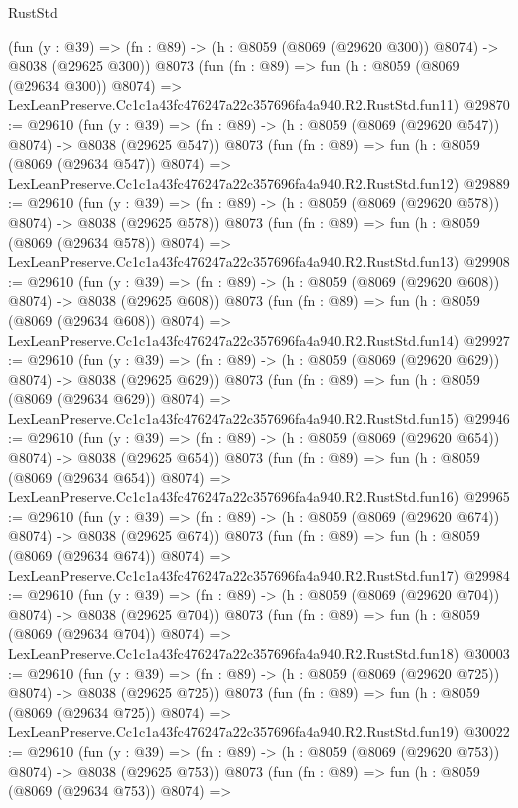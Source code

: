\begin{lexlean}{RustStd}
\begin{coremodule}
    (fun (y : @39) => (fn : @89) -> (h : @8059 (@8069 (@29620 @300)) @8074) -> @8038 (@29625 @300))
    @8073
    (fun (fn : @89) =>
    fun (h : @8059 (@8069 (@29634 @300)) @8074) =>
    LexLeanPreserve.Cc1c1a43fc476247a22c357696fa4a940.R2.RustStd.fun11)
@29870 := @29610
    (fun (y : @39) => (fn : @89) -> (h : @8059 (@8069 (@29620 @547)) @8074) -> @8038 (@29625 @547))
    @8073
    (fun (fn : @89) =>
    fun (h : @8059 (@8069 (@29634 @547)) @8074) =>
    LexLeanPreserve.Cc1c1a43fc476247a22c357696fa4a940.R2.RustStd.fun12)
@29889 := @29610
    (fun (y : @39) => (fn : @89) -> (h : @8059 (@8069 (@29620 @578)) @8074) -> @8038 (@29625 @578))
    @8073
    (fun (fn : @89) =>
    fun (h : @8059 (@8069 (@29634 @578)) @8074) =>
    LexLeanPreserve.Cc1c1a43fc476247a22c357696fa4a940.R2.RustStd.fun13)
@29908 := @29610
    (fun (y : @39) => (fn : @89) -> (h : @8059 (@8069 (@29620 @608)) @8074) -> @8038 (@29625 @608))
    @8073
    (fun (fn : @89) =>
    fun (h : @8059 (@8069 (@29634 @608)) @8074) =>
    LexLeanPreserve.Cc1c1a43fc476247a22c357696fa4a940.R2.RustStd.fun14)
@29927 := @29610
    (fun (y : @39) => (fn : @89) -> (h : @8059 (@8069 (@29620 @629)) @8074) -> @8038 (@29625 @629))
    @8073
    (fun (fn : @89) =>
    fun (h : @8059 (@8069 (@29634 @629)) @8074) =>
    LexLeanPreserve.Cc1c1a43fc476247a22c357696fa4a940.R2.RustStd.fun15)
@29946 := @29610
    (fun (y : @39) => (fn : @89) -> (h : @8059 (@8069 (@29620 @654)) @8074) -> @8038 (@29625 @654))
    @8073
    (fun (fn : @89) =>
    fun (h : @8059 (@8069 (@29634 @654)) @8074) =>
    LexLeanPreserve.Cc1c1a43fc476247a22c357696fa4a940.R2.RustStd.fun16)
@29965 := @29610
    (fun (y : @39) => (fn : @89) -> (h : @8059 (@8069 (@29620 @674)) @8074) -> @8038 (@29625 @674))
    @8073
    (fun (fn : @89) =>
    fun (h : @8059 (@8069 (@29634 @674)) @8074) =>
    LexLeanPreserve.Cc1c1a43fc476247a22c357696fa4a940.R2.RustStd.fun17)
@29984 := @29610
    (fun (y : @39) => (fn : @89) -> (h : @8059 (@8069 (@29620 @704)) @8074) -> @8038 (@29625 @704))
    @8073
    (fun (fn : @89) =>
    fun (h : @8059 (@8069 (@29634 @704)) @8074) =>
    LexLeanPreserve.Cc1c1a43fc476247a22c357696fa4a940.R2.RustStd.fun18)
@30003 := @29610
    (fun (y : @39) => (fn : @89) -> (h : @8059 (@8069 (@29620 @725)) @8074) -> @8038 (@29625 @725))
    @8073
    (fun (fn : @89) =>
    fun (h : @8059 (@8069 (@29634 @725)) @8074) =>
    LexLeanPreserve.Cc1c1a43fc476247a22c357696fa4a940.R2.RustStd.fun19)
@30022 := @29610
    (fun (y : @39) => (fn : @89) -> (h : @8059 (@8069 (@29620 @753)) @8074) -> @8038 (@29625 @753))
    @8073
    (fun (fn : @89) =>
    fun (h : @8059 (@8069 (@29634 @753)) @8074) =>

\end{coremodule}
\end{lexlean}

